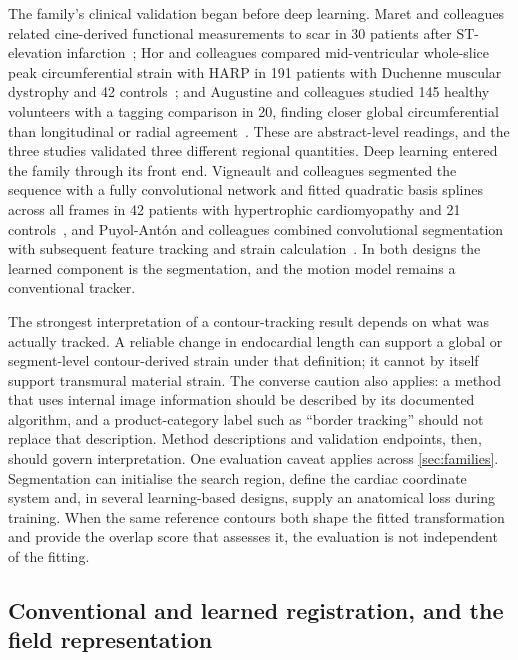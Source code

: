 The family's clinical validation began before deep learning. Maret and colleagues related cine-derived functional measurements to scar in 30 patients after ST-elevation infarction~\cite{maret2009ft}; Hor and colleagues compared mid-ventricular whole-slice peak circumferential strain with HARP in 191 patients with Duchenne muscular dystrophy and 42 controls~\cite{hor2010ft}; and Augustine and colleagues studied 145 healthy volunteers with a tagging comparison in 20, finding closer global circumferential than longitudinal or radial agreement~\cite{augustine2013ft}. These are abstract-level readings, and the three studies validated three different regional quantities. Deep learning entered the family through its front end. Vigneault and colleagues segmented the sequence with a fully convolutional network and fitted quadratic basis splines across all frames in 42 patients with hypertrophic cardiomyopathy and 21 controls~\cite{vigneault2017}, and Puyol-Ant\'on and colleagues combined convolutional segmentation with subsequent feature tracking and strain calculation~\cite{puyolanton2018}. In both designs the learned component is the segmentation, and the motion model remains a conventional tracker.

The strongest interpretation of a contour-tracking result depends on what was actually tracked. A reliable change in endocardial length can support a global or segment-level contour-derived strain under that definition; it cannot by itself support transmural material strain. The converse caution also applies: a method that uses internal image information should be described by its documented algorithm, and a product-category label such as ``border tracking'' should not replace that description. Method descriptions and validation endpoints, then, should govern interpretation. One evaluation caveat applies across \cref{sec:families}. Segmentation can initialise the search region, define the cardiac coordinate system and, in several learning-based designs, supply an anatomical loss during training. When the same reference contours both shape the fitted transformation and provide the overlap score that assesses it, the evaluation is not independent of the fitting.

\subsection{Conventional and learned registration, and the field representation}\label{sec:registration}

